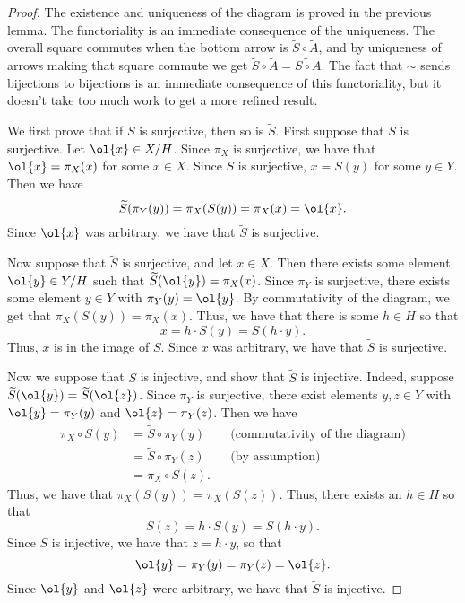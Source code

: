 \documentclass[12nt]{article}
\theoremstyle{plain}
\begin{document}
\begin{proof}
The existence and uniqueness of the diagram is proved in the previous lemma. The functoriality is an immediate consequence of the uniqueness. The overall square commutes when the bottom arrow is $\widetilde{S} \circ \widetilde{A}$, and by uniqueness of arrows making that square commute we get $\widetilde{S} \circ \widetilde{A} = \widetilde{S \circ A}$. The fact that $\sim$ sends bijections to bijections is an immediate consequence of this functoriality, but it doesn't take too much work to get a more refined result.

We first prove that if $S$ is surjective, then so is $\widetilde{S}$. First suppose that $S$ is surjective. Let $\ol{x} \in X/H$. Since $\pi_X$ is surjective, we have that $\ol{x} = \pi_X(x)$ for some $x \in X$. Since $S$ is surjective, $x = S(y)$ for some $y \in Y$. Then we have
\[
\widetilde{S}(\pi_Y(y)) = \pi_X(S(y)) = \pi_X(x) = \ol{x}.
\]
Since $\ol{x}$ was arbitrary, we have that $\widetilde{S}$ is surjective. 

Now suppose that $\widetilde{S}$ is surjective, and let $x \in X$. Then there exists some element $\ol{y} \in Y/H$ such that $\widetilde{S}(\ol{y}) = \pi_X(x)$. Since $\pi_Y$ is surjective, there exists some element $y \in Y$ with $\pi_Y(y) = \ol{y}$. By commutativity of the diagram, we get that $\pi_X(S(y)) = \pi_X(x)$. Thus, we have that there is some $h \in H$ so that 
\[
x = h \cdot S(y) = S(h \cdot y).
\]
Thus, $x$ is in the image of $S$. Since $x$ was arbitrary, we have that $\widetilde{S}$ is surjective.

Now we suppose that $S$ is injective, and show that $\widetilde{S}$ is injective. Indeed, suppose $\widetilde{S}(\ol{y}) = \widetilde{S}(\ol{z})$. Since $\pi_Y$ is surjective, there exist elements $y, z \in Y$ with $\ol{y} = \pi_Y(y)$ and $\ol{z} = \pi_Y(z)$. Then we have
\begin{align*}
\pi_X \circ S(y) &= \widetilde{S} \circ \pi_Y(y) &&\text{(commutativity of the diagram)}\\
	&= \widetilde{S} \circ \pi_Y(z) && \text{(by assumption)} \\
	&= \pi_X \circ S(z).
\end{align*}
Thus, we have that $\pi_X(S(y)) = \pi_X(S(z))$. Thus, there exists an $h \in H$ so that \[
S(z) = h \cdot S(y) = S(h \cdot y).
\]
Since $S$ is injective, we have that $z = h \cdot y$, so that 
\[
\ol{y} = \pi_Y(y) = \pi_Y(z) = \ol{z}.
\] Since $\ol{y}$ and $\ol{z}$ were arbitrary, we have that $\widetilde{S}$ is injective. 


\end{proof}
\end{document}
